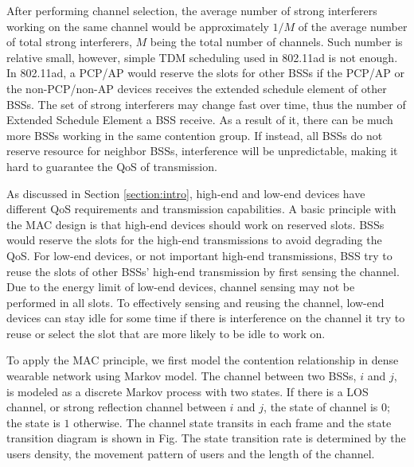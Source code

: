 \documentclass[10pt, conference, letterpaper]{IEEEtran}
\begin{document}
After performing channel selection, the average number of strong interferers working on the same channel would be approximately $1/M$ of the average number of total strong interferers, $M$ being the total number of channels. Such number is relative small, however, simple TDM scheduling used in 802.11ad is not enough. In 802.11ad, a PCP/AP would reserve the slots for other BSSs if the PCP/AP or the non-PCP/non-AP devices receives the extended schedule element of other BSSs. The set of strong interferers may change fast over time, thus the number of Extended Schedule Element a BSS receive. As a result of it, there can be much more BSSs working in the same contention group. If instead, all BSSs do not reserve resource for neighbor BSSs, interference will be unpredictable, making it hard to guarantee the QoS of transmission. 

As discussed in Section \ref{section:intro}, high-end and low-end devices have different QoS requirements and transmission capabilities. A basic principle with the MAC design is that high-end devices should work on reserved slots. BSSs would reserve the slots for the high-end transmissions to avoid degrading the QoS. For low-end devices, or not important high-end transmissions, BSS try to reuse the slots of other BSSs' high-end transmission by first sensing the channel. Due to the energy limit of low-end devices, channel sensing may not be performed in all slots. To effectively sensing and reusing the channel, low-end devices can stay idle for some time if there is interference on the channel it try to reuse or select the slot that are more likely to be idle to work on. 

To apply the MAC principle, we first model the contention relationship in dense wearable network using Markov model. The channel between two BSSs, $i$ and $j$, is modeled as a discrete Markov process with two states. If there is a LOS channel, or strong reflection channel between $i$ and $j$, the state of channel is $0$; the state is $1$ otherwise. The channel state transits in each frame and the state transition diagram is shown in Fig. %
The state transition rate is determined by the users density, the movement pattern of users and the length of the channel. 
\end{document}
